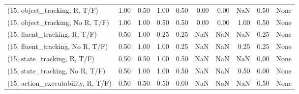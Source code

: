 \begin{table*}[h!]
\begin{adjustbox}{width=2\columnwidth,center}
\begin{tabular}{lrrr|rrr|rrr}
\midrule
(15, object\_tracking, R, T/F)         &                      1.00 &                  0.50 &                      1.00 &                          0.50 &                      0.00 &                          0.00 &                                    NaN &                               0.50 &                                  None \\
(15, object\_tracking, No R, T/F)      &                      1.00 &                  1.00 &                      0.50 &                          0.50 &                      0.00 &                          0.00 &                                   1.00 &                               0.50 &                                  None \\
(15, fluent\_tracking, R, T/F)         &                      0.50 &                  1.00 &                      0.25 &                          0.25 &                       NaN &                           NaN &                                    NaN &                               0.25 &                                  None \\
(15, fluent\_tracking, No R, T/F)      &                      0.50 &                  1.00 &                      1.00 &                          0.25 &                       NaN &                           NaN &                                   0.25 &                               0.25 &                                  None \\
(15, state\_tracking, R, T/F)          &                      0.50 &                  0.50 &                      1.00 &                          0.50 &                       NaN &                           NaN &                                    NaN &                               0.00 &                                  None \\
(15, state\_tracking, No R, T/F)       &                      0.50 &                  1.00 &                      1.00 &                          0.50 &                       NaN &                           NaN &                                   0.50 &                               0.00 &                                  None \\
(15, action\_executability, R, T/F)    &                      0.50 &                  0.50 &                      0.50 &                          0.00 &                       NaN &                           NaN &                                    NaN &                               0.50 &                                  None \\

\end{tabular}
\end{adjustbox}
\end{table*}
